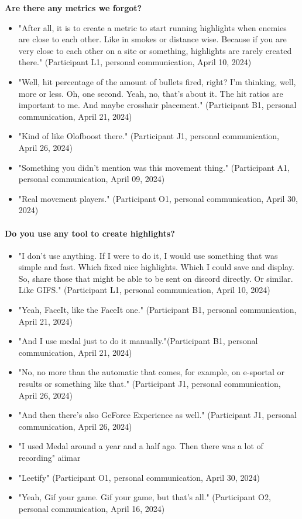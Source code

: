     \textbf{Are there any metrics we forgot?}
    \begin{itemize}
        \item "After all, it is to create a metric to start running highlights when enemies are close to each other. Like in smokes or distance wise. Because if you are very close to each other on a site or something, highlights are rarely created there." (Participant L1, personal communication, April 10, 2024)
        \item "Well, hit percentage of the amount of bullets fired, right? I'm thinking, well, more or less. Oh, one second. Yeah, no, that's about it. The hit ratios are important to me. And maybe crosshair placement." (Participant B1, personal communication, April 21, 2024)
        \item "Kind of like Olofboost there." (Participant J1, personal communication, April 26, 2024)
        \item "Something you didn't mention was this movement thing." (Participant A1, personal communication, April 09, 2024)
        \item "Real movement players." (Participant O1, personal communication, April 30, 2024)
    \end{itemize}
\paragraph{Do you use any tool to create highlights?}
\begin{itemize}
    \item "I don't use anything. If I were to do it, I would use something that was simple and fast. Which fixed nice highlights. Which I could save and display. So, share those that might be able to be sent on discord directly. Or similar. Like GIFS." (Participant L1, personal communication, April 10, 2024)
    \item  "Yeah, FaceIt, like the FaceIt one." (Participant B1, personal communication, April 21, 2024)
    \item "And I use medal just to do it manually."(Participant B1, personal communication, April 21, 2024)
    \item "No, no more than the automatic that comes, for example, on e-sportal or results or something like that." (Participant J1, personal communication, April 26, 2024)
    \item "And then there's also GeForce Experience as well." (Participant J1, personal communication, April 26, 2024)
    \item "I used Medal around a year and a half ago. Then there was a lot of recording" {aiimar}
    \item "Leetify" (Participant O1, personal communication, April 30, 2024)
    \item "Yeah, Gif your game. Gif your game, but that's all." (Participant O2, personal communication, April 16, 2024)
    
\end{itemize}


